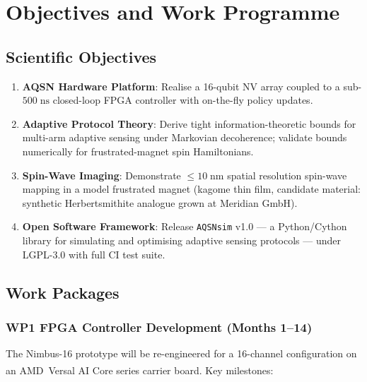 \section{Objectives and Work Programme}
\label{sec:objectives}

\subsection{Scientific Objectives}

\begin{tcolorbox}[dfgbox, title={Primary Research Objectives}]
\begin{enumerate}[leftmargin=*,label=\textbf{O\arabic*.},itemsep=4pt]
  \item \textbf{AQSN Hardware Platform}: Realise a 16-qubit NV array coupled to a
        sub-$500\;\text{ns}$ closed-loop FPGA controller with on-the-fly policy
        updates.
  \item \textbf{Adaptive Protocol Theory}: Derive tight information-theoretic bounds for
        multi-arm adaptive sensing under Markovian decoherence; validate bounds
        numerically for frustrated-magnet spin Hamiltonians.
  \item \textbf{Spin-Wave Imaging}: Demonstrate $\leq10\;\text{nm}$ spatial resolution
        spin-wave mapping in a model frustrated magnet (kagome thin film, candidate
        material: synthetic Herbertsmithite analogue grown at Meridian GmbH).
  \item \textbf{Open Software Framework}: Release \texttt{AQSNsim} v1.0 --- a
        Python/Cython library for simulating and optimising adaptive sensing protocols
        --- under LGPL-3.0 with full CI test suite.
\end{enumerate}
\end{tcolorbox}

\subsection{Work Packages}

\subsubsection*{WP1 \textemdash{} FPGA Controller Development (Months 1--14)}

The Nimbus-16 prototype will be re-engineered for a 16-channel configuration on an
AMD~Versal\textsuperscript{\texttrademark} AI Core series carrier board. Key milestones:

